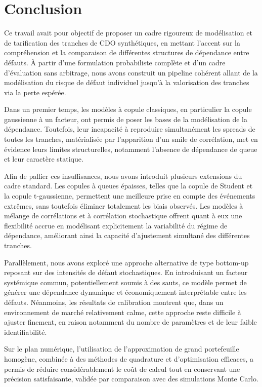\section{Conclusion}

Ce travail avait pour objectif de proposer un cadre rigoureux de modélisation et de tarification des tranches de CDO synthétiques, en mettant l’accent sur la compréhension et la comparaison de différentes structures de dépendance entre défauts. À partir d’une formulation probabiliste complète et d’un cadre d’évaluation sans arbitrage, nous avons construit un pipeline cohérent allant de la modélisation du risque de défaut individuel jusqu’à la valorisation des tranches via la perte espérée.

Dans un premier temps, les modèles à copule classiques, en particulier la copule gaussienne à un facteur, ont permis de poser les bases de la modélisation de la dépendance. Toutefois, leur incapacité à reproduire simultanément les spreads de toutes les tranches, matérialisée par l’apparition d’un smile de corrélation, met en évidence leurs limites structurelles, notamment l’absence de dépendance de queue et leur caractère statique.

Afin de pallier ces insuffisances, nous avons introduit plusieurs extensions du cadre standard. Les copules à queues épaisses, telles que la copule de Student et la copule t-gaussienne, permettent une meilleure prise en compte des événements extrêmes, sans toutefois éliminer totalement les biais observés. Les modèles à mélange de corrélations et à corrélation stochastique offrent quant à eux une flexibilité accrue en modélisant explicitement la variabilité du régime de dépendance, améliorant ainsi la capacité d’ajustement simultané des différentes tranches.

Parallèlement, nous avons exploré une approche alternative de type bottom-up reposant sur des intensités de défaut stochastiques. En introduisant un facteur systémique commun, potentiellement soumis à des sauts, ce modèle permet de générer une dépendance dynamique et économiquement interprétable entre les défauts. Néanmoins, les résultats de calibration montrent que, dans un environnement de marché relativement calme, cette approche reste difficile à ajuster finement, en raison notamment du nombre de paramètres et de leur faible identifiabilité.

Sur le plan numérique, l’utilisation de l’approximation de grand portefeuille homogène, combinée à des méthodes de quadrature et d’optimisation efficaces, a permis de réduire considérablement le coût de calcul tout en conservant une précision satisfaisante, validée par comparaison avec des simulations Monte Carlo.

